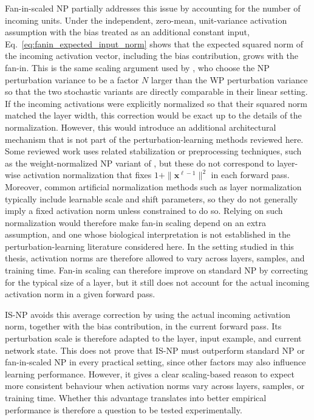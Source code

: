 Fan-in-scaled NP partially addresses this issue by accounting for the number of incoming units. Under the independent, zero-mean, unit-variance activation assumption with the bias treated as an additional constant input, Eq.~\eqref{eq:fanin_expected_input_norm} shows that the expected squared norm of the incoming activation vector, including the bias contribution, grows with the fan-in. This is the same scaling argument used by \textcite{werfel_learning_2003}, who choose the NP perturbation variance to be a factor $N$ larger than the WP perturbation variance so that the two stochastic variants are directly comparable in their linear setting. If the incoming activations were explicitly normalized so that their squared norm matched the layer width, this correction would be exact up to the details of the normalization. However, this would introduce an additional architectural mechanism that is not part of the perturbation-learning methods reviewed here. Some reviewed work uses related stabilization or preprocessing techniques, such as the weight-normalized NP variant of \textcite{hiratani_stability_2022}, but these do not correspond to layer-wise activation normalization that fixes \(1+\|\mathbf{x}^{\ell-1}\|^2\) in each forward pass. Moreover, common artificial normalization methods such as layer normalization typically include learnable scale and shift parameters, so they do not generally imply a fixed activation norm unless constrained to do so. Relying on such normalization would therefore make fan-in scaling depend on an extra assumption, and one whose biological interpretation is not established in the perturbation-learning literature considered here. In the setting studied in this thesis, activation norms are therefore allowed to vary across layers, samples, and training time. Fan-in scaling can therefore improve on standard NP by correcting for the typical size of a layer, but it still does not account for the actual incoming activation norm in a given forward pass.

IS-NP avoids this average correction by using the actual incoming activation norm, together with the bias contribution, in the current forward pass. Its perturbation scale is therefore adapted to the layer, input example, and current network state. This does not prove that IS-NP must outperform standard NP or fan-in-scaled NP in every practical setting, since other factors may also influence learning performance. However, it gives a clear scaling-based reason to expect more consistent behaviour when activation norms vary across layers, samples, or training time. Whether this advantage translates into better empirical performance is therefore a question to be tested experimentally.
